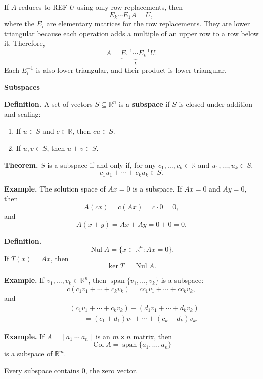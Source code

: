 \documentclass{article}
\begin{document}
\newpage

If $A$ reduces to REF $U$ using only row replacements, then
\[
E_k\cdots E_1A=U,
\]
where the $E_i$ are elementary matrices for the row replacements. They are lower triangular because each operation adds a multiple of an upper row to a row below it. Therefore,
\[
A=\underbrace{E_1^{-1}\cdots E_k^{-1}}_{L}U.
\]
Each $E_i^{-1}$ is also lower triangular, and their product is lower triangular.

\newpage

\textbf{Subspaces}

\medskip

\textbf{Definition.} A set of vectors $S\subseteq\mathbb{R}^n$ is a \textbf{subspace} if $S$ is closed under addition and scaling:
\begin{enumerate}
\item If $u\in S$ and $c\in\mathbb{R}$, then $cu\in S$.
\item If $u,v\in S$, then $u+v\in S$.
\end{enumerate}

\textbf{Theorem.} $S$ is a subspace if and only if, for any $c_1,\ldots,c_k\in\mathbb{R}$ and $u_1,\ldots,u_k\in S$,
\[
c_1u_1+\cdots+c_ku_k\in S.
\]

\bigskip

\textbf{Example.} The solution space of $Ax=0$ is a subspace. If $Ax=0$ and $Ay=0$, then
\[
A(cx)=c(Ax)=c\cdot 0=0,
\]
and
\[
A(x+y)=Ax+Ay=0+0=0.
\]

\bigskip

\textbf{Definition.}
\[
\operatorname{Nul} A=\{x\in\mathbb{R}^n:Ax=0\}.
\]
If $T(x)=Ax$, then
\[
\ker T=\operatorname{Nul} A.
\]

\newpage

\textbf{Example.} If $v_1,\ldots,v_k\in\mathbb{R}^n$, then $\operatorname{span}\{v_1,\ldots,v_k\}$ is a subspace:
\[
c(c_1v_1+\cdots+c_kv_k)=cc_1v_1+\cdots+cc_kv_k,
\]
and
\begin{align*}
&(c_1v_1+\cdots+c_kv_k)+(d_1v_1+\cdots+d_kv_k)\\
&\qquad=(c_1+d_1)v_1+\cdots+(c_k+d_k)v_k.
\end{align*}

\bigskip

\textbf{Example.} If $A=[a_1\ \cdots\ a_n]$ is an $m\times n$ matrix, then
\[
\operatorname{Col} A=\operatorname{span}\{a_1,\ldots,a_n\}
\]
is a subspace of $\mathbb{R}^m$.

\medskip

Every subspace contains $0$, the zero vector.
\end{document}

